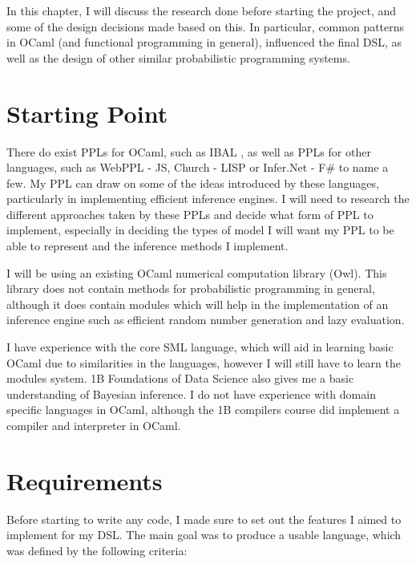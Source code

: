 
In this chapter, I will discuss the research done before starting the project, and some of the design decisions made based on this. In particular, common patterns in OCaml (and functional programming in general), influenced the final DSL, as well as the design of other similar probabilistic programming systems.

\section{Starting Point}

There do exist PPLs for OCaml, such as IBAL \cite{kiselyov2009embedded}, as well as PPLs for other languages, such as WebPPL - JS\cite{mobus2018structure}, Church - LISP\cite{goodman2012church} or Infer.Net - F\#\cite{wang2011using} to name a few. My PPL can draw on some of the ideas introduced by these languages, particularly in implementing efficient inference engines. I will need to research the different approaches taken by these PPLs and decide what form of PPL to implement, especially in deciding the types of model I will want my PPL to be able to represent and the inference methods I implement.

I will be using an existing OCaml numerical computation library (Owl). This library does not contain methods for probabilistic programming in general, although it does contain modules which will help in the implementation of an inference engine such as efficient random number generation and lazy evaluation.

I have experience with the core SML language, which will aid in learning basic OCaml due to similarities in the languages, however I will still have to learn the modules system. 1B Foundations of Data Science also gives me a basic understanding of Bayesian inference. I do not have experience with domain specific languages in OCaml, although the 1B compilers course did implement a compiler and interpreter in OCaml.

\section{Requirements}

Before starting to write any code, I made sure to set out the features I aimed to implement for my DSL. The main goal was to produce a usable language, which was defined by the following criteria:


